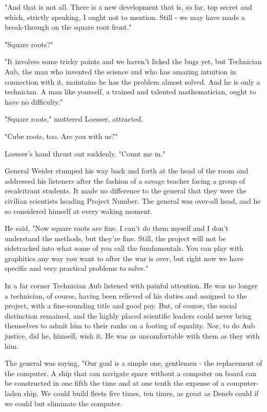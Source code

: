 \documentclass{amsart}
\begin{document}
"And that is not all. There is a new development that is, so far, top
secret and which, strictly speaking, I ought not to mention. Still -
we may have made a break-through on the square root front."

"Square roots?"

"It involves some tricky points and we haven't licked the bugs yet,
but Technician Aub, the man who invented the science and who has
amazing intuition in connection with it, maintains he has the problem
almost solved. And he is only a technician. A man like yourself, a
trained and talented mathematician, ought to have no difficulty."

"Square roots," muttered Loesser, attracted.

"Cube roots, too. Are you with us?"

Loesser's hand thrust out suddenly. "Count me in."

General Weider stumped his way back and forth at the head of the room
and addressed his listeners after the fashion of a savage teacher
facing a group of recalcitrant students. It made no difference to the
general that they were the civilian scientists heading Project Number.
The general was over-all head, and he so considered himself at every
waking moment.

He said, "Now square roots are fine. I can't do them myself and I
don't understand the methods, but they're fine. Still, the project
will not be sidetracked into what some of you call the fundamentals.
You can play with graphitics any way you want to after the war is
over, but right now we have specific and very practical problems to
solve."

In a far corner Technician Aub listened with painful attention. He was
no longer a technician, of course, having been relieved of his duties
and assigned to the project, with a fine-sounding title and good pay.
But, of course, the social distinction remained, and the highly placed
scientific leaders could never bring themselves to admit him to their
ranks on a footing of equality. Nor, to do Aub justice, did he,
himself, wish it. He was as uncomfortable with them as they with him.

The general was saying, "Our goal is a simple one, gentlemen - the
replacement of the computer. A ship that can navigate space without a
computer on board can be constructed in one fifth the time and at one
tenth the expense of a computer-laden ship. We could build fleets five
times, ten times, as great as Deneb could if we could but eliminate
the computer.
\end{document}
